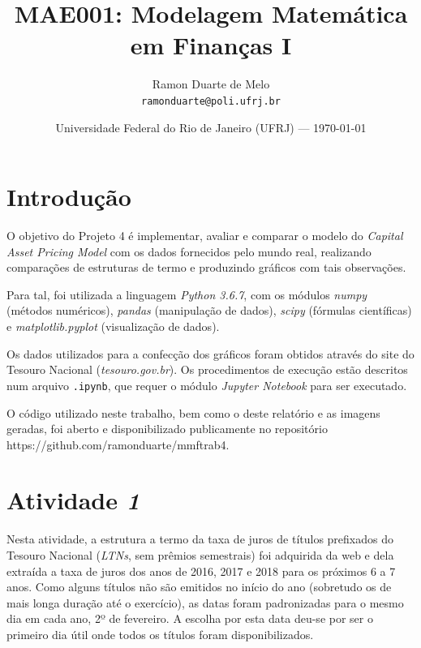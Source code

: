 \documentclass{article}
\title{MAE001: Modelagem Matemática em Finanças I} %
\date{Universidade Federal do Rio de Janeiro (UFRJ) --- \today} %
\author{Ramon Duarte de Melo\\ \texttt{ramonduarte@poli.ufrj.br}} %
\begin{document}
\maketitle %


\section*{Introdução} %

O objetivo do Projeto 4 é implementar, avaliar e comparar o modelo do \emph{Capital Asset Pricing Model} com os dados fornecidos pelo mundo real, realizando comparações de estruturas de termo e produzindo gráficos com tais observações. 

Para tal, foi utilizada a linguagem \emph{Python 3.6.7}, com os módulos \emph{numpy} (métodos numéricos), \emph{pandas} (manipulação de dados), \emph{scipy} (fórmulas científicas) e \emph{matplotlib.pyplot} (visualização de dados).

Os dados utilizados para a confecção dos gráficos foram obtidos através do site do Tesouro Nacional (\textsl{tesouro.gov.br}). Os procedimentos de execução estão descritos num arquivo \texttt{.ipynb}, que requer o módulo \emph{Jupyter Notebook} para ser executado.


O código utilizado neste trabalho, bem como o deste relatório e as imagens geradas, foi aberto e disponibilizado publicamente no repositório https://github.com/ramonduarte/mmftrab4.



\section*{Atividade \emph{1}} %

Nesta atividade, a estrutura a termo da taxa de juros de títulos prefixados do Tesouro Nacional (\emph{LTNs}, sem prêmios semestrais) foi adquirida da web e dela extraída a taxa de juros dos anos de 2016, 2017 e 2018 para os próximos 6 a 7 anos.
Como alguns títulos não são emitidos no início do ano (sobretudo os de mais longa duração até o exercício), as datas foram padronizadas para o mesmo dia em cada ano, 2º de fevereiro.
A escolha por esta data deu-se por ser o primeiro dia útil onde todos os títulos foram disponibilizados.
\end{document}
